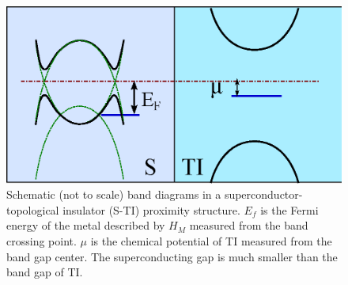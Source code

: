 \begin{figure}
\center
\includegraphics[width=\textwidth]{include/setup.eps}
\caption{Schematic (not to scale) band diagrams  in a superconductor-topological insulator (S-TI) proximity
structure. $E_f$ is the Fermi energy of the metal described by $H_M$ measured from the band crossing point. $\mu$ is
the chemical potential of TI measured from the band gap center. The superconducting gap
is much smaller than the band gap of TI.
}\label{setup}
\end{figure}


